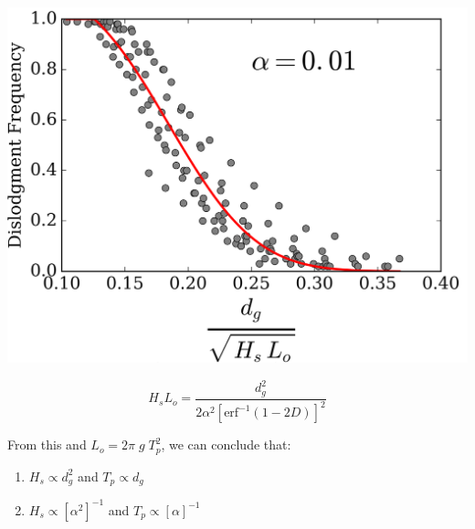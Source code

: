 \documentclass{beamer}
\begin{document}
\begin{frame}[t]
\begin{center}

\includegraphics[scale=0.2]{bouldernewt.png}
\end{center}

\vspace*{-1em}\begin{equation}
H_s L_o = \frac{d^2_g}{2\alpha^2 \left[\textrm{erf}^{-1}(1 - 2D)\right]^2}
\end{equation}

From this and $L_o = 2\pi \;g \;T_p^2$, we can conclude that:
\begin{enumerate}
    \item $H_s \propto d^2_g$ and $T_p \propto d_g$
    \item $H_s \propto \left[\alpha^2\right]^{-1}$ and $T_p \propto \left[\alpha\right]^{-1}$
\end{enumerate}

\end{frame}
\end{document}
